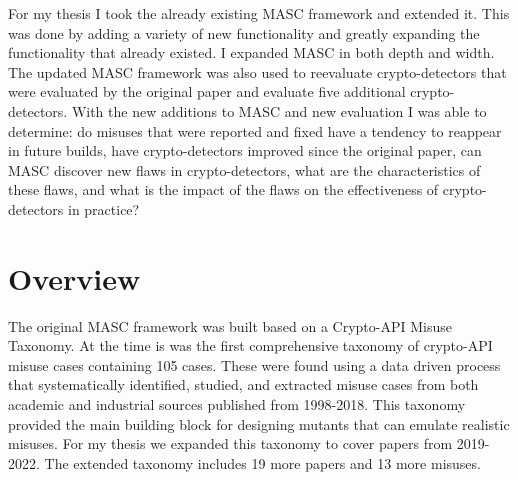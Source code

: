 For my thesis I took the already existing MASC framework and extended it. This was done by adding a variety of new functionality and greatly expanding the functionality that already existed. I expanded MASC in both depth and width. The updated MASC framework was also used to reevaluate crypto-detectors that were evaluated by the original paper and evaluate five additional crypto-detectors. With the new additions to MASC and new evaluation I was able to determine: do misuses that were reported and fixed have a tendency to reappear in future builds, have crypto-detectors improved since the original paper, can MASC discover new flaws in crypto-detectors, what are the characteristics of these flaws, and what is the impact of the flaws on the effectiveness of crypto-detectors in practice?



\section{Overview}
\label{ch1:sec:overview}


The original MASC framework was built based on a Crypto-API Misuse Taxonomy. At the time is was the first comprehensive taxonomy of crypto-API misuse cases containing 105 cases. These were found using a data driven process that systematically identified, studied, and extracted misuse cases from both academic and industrial sources published from 1998-2018. This taxonomy provided the main building block for designing mutants that can emulate realistic misuses. For my thesis we expanded this taxonomy to cover papers from 2019-2022. The extended taxonomy includes 19 more papers and 13 more misuses.

